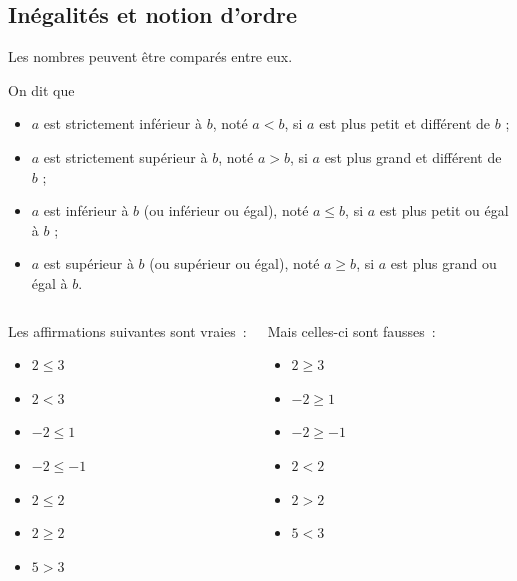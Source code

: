 \documentclass[french,xcolor=svgnames]{beamer}
\begin{document}
\subsection{Inégalités et notion d'ordre}
\label{sec:inegalites}
\begin{frame}
  Les nombres peuvent être comparés entre eux.\pause{}
  \begin{definition}
    On dit que
    \begin{itemize}
    \item \og \(a\) est strictement inférieur à \(b\)\fg{},\pause{} noté \(a < b\),\pause{} si \(a\) est plus petit et différent de \(b\) ;\pause
    \item \og \(a\) est strictement supérieur à \(b\)\fg{},\pause{} noté \(a > b\),\pause{} si \(a\) est plus grand et différent de \(b\) ;\pause
    \item \og \(a\) est inférieur à \(b\)\fg{} (ou \og inférieur ou égal\fg{}), noté \(a \leq b\), si \(a\) est plus petit ou égal à \(b\) ;\pause
    \item \og \(a\) est supérieur à \(b\)\fg{} (ou \og supérieur ou égal\fg{}), noté \(a \geq b\), si \(a\) est plus grand ou égal à \(b\).
    \end{itemize}
  \end{definition}
\end{frame}
\begin{frame}
  \begin{columns}[t]
    \begin{example}
      Les affirmations suivantes sont vraies~:
      \begin{itemize}
      \item \(2 \leq 3\)
      \item \(2 < 3\)
      \item \(-2 \leq 1\)
      \item \(-2 \leq -1\)
      \item \(2 \leq 2\)
      \item \(2 \geq 2\)
      \item \(5 > 3\)
      \end{itemize}
    \end{example}\pause

    \begin{example}
      Mais celles-ci sont fausses~:
      \begin{itemize}
      \item \(2 \geq 3\)
      \item \(-2 \geq 1\)
      \item \(-2 \geq -1\)
      \item \(2 < 2\)
      \item \(2 > 2\)
      \item \(5 < 3\)
      \end{itemize}
    \end{example}
  \end{columns}
\end{frame}
\end{document}
